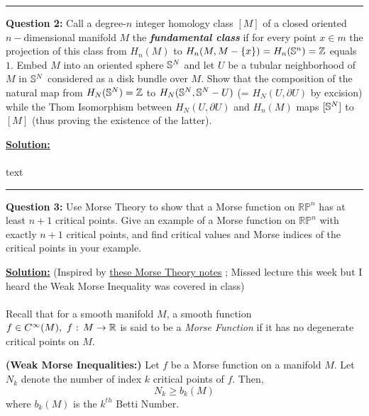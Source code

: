 \documentclass[11pt]{article}
\begin{document}

\vskip 0.5cm
\hrule
\pagebreak




\begin{bluebox}
  \textbf{Question 2:} Call a degree-$n$ integer homology class $[M]$ of a closed oriented $n-$dimensional manifold $M$ the \textbf{\emph{fundamental class}} if for every point $x \in m$ the projection of this class from $H_{n}(M)$ to $H_n(M, M-\{x\}) = H_{n}(\mathbb{S}^n) = \mathbb{Z}$ equals $1$. Embed $M$ into an oriented sphere $\mathbb{S}^N$ and let $U$ be a tubular neighborhood of $M$ in $\mathbb{S}^N$ considered as a disk bundle over $M$. Show that the composition of the natural map from $H_N(\mathbb{S}^N) = \mathbb{Z}$ to $H_N{(\mathbb{S}^N, \mathbb{S}^N - U)}$ (= $H_N(U, \partial U)$ by excision) while the Thom Isomorphism between $H_{N}(U, \partial U)$ and $H_{n}(M)$ maps $[\mathbb{S}^N]$ to $[M]$ (thus proving the existence of the latter). 
\end{bluebox}

\vskip 0.5cm
\textbf{\underline{Solution:}} 
\\
\\
text
\vskip 0.5cm
\hrule
\pagebreak



\begin{bluebox}
  \textbf{Question 3:} Use Morse Theory to show that a Morse function on $\mathbb{RP}^n$ has at least $n+1$ critical points. Give an example of a Morse function on $\mathbb{RP}^n$ with exactly $n+1$ critical points, and find critical values and Morse indices of the critical points in your example.
\end{bluebox}

\vskip 0.5cm
\textbf{\underline{Solution:}} (Inspired by \href{https://stanford.edu/~sfh/morse.pdf}{these Morse Theory notes} 
; Missed lecture this week but I heard the Weak Morse Inequality was covered in class)
\\
\\
Recall that for a smooth manifold $M$, a smooth function $f \in C^{\infty}(M), ~f \text{ : } M \rightarrow \mathbb{R}$ is said to be a \emph{Morse Function} if it has no degenerate critical points on $M$.
\\
\begin{redbox}
  \begin{theorem}
    \textbf{(Weak Morse Inequalities:)} Let $f$ be a Morse function on a manifold $M$. Let $N_k$ denote the number of index $k$ critical points of $f$. Then, $$ N_k \geq b_k(M) $$ where $b_k(M)$ is the $k^{th}$ Betti Number.
  \end{theorem}
\end{redbox}
\end{document}
